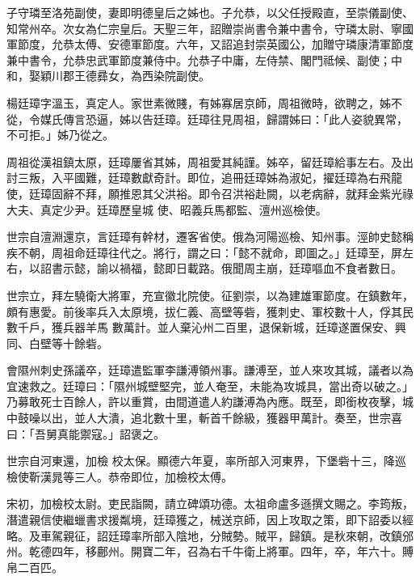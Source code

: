 \begin{pinyinscope}
 子守璘至洛苑副使，妻即明德皇后之姊也。子允恭，以父任授殿直，至崇儀副使、知常州卒。次女為仁宗皇后。天聖三年，詔贈崇尚書令兼中書令，守璘太尉、寧國軍節度，允恭太傅、安德軍節度。六年，又詔追封崇英國公，加贈守璘康清軍節度兼中書令，允恭忠武軍節度兼侍中。允恭子中庸，左侍禁、閣門祗候、副使；中和，娶穎川郡王德彞女，為西染院副使。



 楊廷璋字溫玉，真定人。家世素微賤，有姊寡居京師，周祖微時，欲聘之，姊不從，令媒氏傳言恐逼，姊以告廷璋。廷璋往見周祖，歸謂姊曰：「此人姿貌異常，不可拒。」姊乃從之。



 周祖從漢祖鎮太原，廷璋屢省其姊，周祖愛其純謹。姊卒，留廷璋給事左右。及出討三叛，入平國難，廷璋數獻奇計。即位，追冊廷璋姊為淑妃，擢廷璋為右飛龍使，廷璋固辭不拜，願推恩其父洪裕。即令召洪裕赴闕，以老病辭，就拜金紫光祿大夫、真定少尹。廷璋歷皇城
 使、昭義兵馬都監、澶州巡檢使。



 世宗自澶淵還京，言廷璋有幹材，遷客省使。俄為河陽巡檢、知州事。涇帥史懿稱疾不朝，周祖命廷璋往代之。將行，謂之曰：「懿不就命，即圖之。」廷璋至，屏左右，以詔書示懿，諭以禍福，懿即日載路。俄聞周主崩，廷璋嘔血不食者數日。



 世宗立，拜左驍衛大將軍，充宣徽北院使。征劉崇，以為建雄軍節度。在鎮數年，頗有惠愛。前後率兵入太原境，拔仁義、高壁等砦，獲刺史、軍校數十人，俘其民數千戶，獲兵器羊馬
 數萬計。並人棄沁州二百里，退保新城，廷璋遂置保安、興同、白壁等十餘砦。



 會隰州刺史孫議卒，廷璋遣監軍李謙溥領州事。謙溥至，並人來攻其城，議者以為宜速救之。廷璋曰：「隰州城壁堅完，並人奄至，未能為攻城具，當出奇以破之。」乃募敢死士百餘人，許以重賞，由間道遣人約謙溥為內應。既至，即銜枚夜擊，城中鼓噪以出，並人大潰，追北數十里，斬首千餘級，獲器甲萬計。奏至，世宗喜曰：「吾舅真能禦寇。」詔褒之。



 世宗自河東還，加檢
 校太保。顯德六年夏，率所部入河東界，下堡砦十三，降巡檢使靳漢晁等三人。恭帝即位，加檢校太傅。



 宋初，加檢校太尉。吏民詣闕，請立碑頌功德。太祖命盧多遜撰文賜之。李筠叛，潛遣親信使繼蠟書求援粼境，廷璋獲之，械送京師，因上攻取之策，即下詔委以經略。及車駕親征，詔廷璋率所部入陰地，分賊勢。賊平，歸鎮。是秋來朝，改鎮邠州。乾德四年，移鄜州。開寶二年，召為右千牛衛上將軍。四年，卒，年六十。賻帛二百匹。




\end{pinyinscope}
